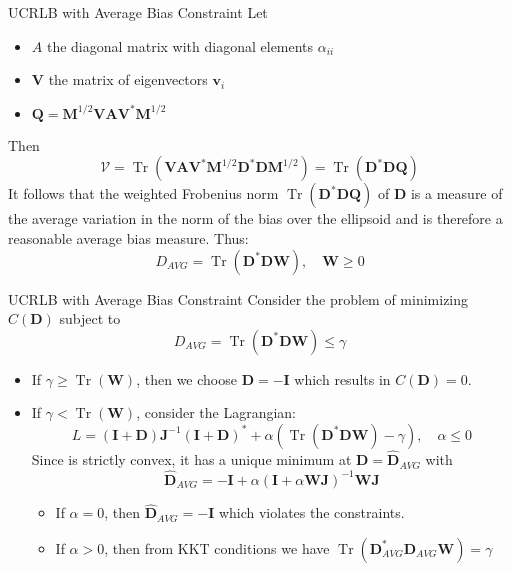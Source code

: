 \documentclass{beamer}
\begin{document}
\begin{frame}{UCRLB with Average Bias Constraint}
Let
\begin{itemize}
    \item $A$ the diagonal matrix with diagonal elements $\alpha_{ii}$
    \item $\mathbf{V}$ the matrix of eigenvectors $\mathbf{v}_i$
    \item $\mathbf{Q} = \mathbf{M}^{1/2} \mathbf{V A V}^* \mathbf{M}^{1/2}$
\end{itemize}
Then 
\[
 \mathcal{V} = \operatorname{Tr}\left(\mathbf{V A V}^*\mathbf{M}^{1/2}\mathbf{D}^*\mathbf{DM}^{1/2}\right)
  = \operatorname{Tr}(\mathbf{D}^*\mathbf{D Q})
\]
It follows that the weighted Frobenius norm $\operatorname{Tr}(\mathbf{D}^*\mathbf{D Q})$ of $\mathbf{D}$ 
is a measure of the average variation in the norm of the bias over the ellipsoid and is therefore a reasonable
average bias measure. Thus:
\[
D_{AVG} = \operatorname{Tr}(\mathbf{D}^*\mathbf{D W}), \quad \mathbf{W} \geq 0
\]
\end{frame}

\begin{frame}{UCRLB with Average Bias Constraint}
    Consider the problem of minimizing $C(\mathbf{D})$ subject to
    \[
    D_{AVG} = \operatorname{Tr}(\mathbf{D}^*\mathbf{D W}) \leq \gamma
    \]
    \begin{itemize}
        \item If $\gamma \geq \operatorname{Tr}(\mathbf{W})$, then we choose $\mathbf{D} = -\mathbf{I}$ which
        results in $C(\mathbf{D}) = 0$.
        \item If $\gamma < \operatorname{Tr}(\mathbf{W})$, consider the Lagrangian:
        \[
        L = (\mathbf{I} + \mathbf{D}) \mathbf{J}^{-1} (\mathbf{I} + \mathbf{D})^* +
        \alpha (\operatorname{Tr}(\mathbf{D}^*\mathbf{D W}) - \gamma), \quad \alpha \leq 0
        \]
        Since is strictly convex, it has a unique minimum at $\mathbf{D} = \hat{\mathbf{D}}_{AVG}$ with
        \[
        \hat{\mathbf{D}}_{AVG} = -\mathbf{I} + \alpha (\mathbf{I} + \alpha \mathbf{W J})^{-1}\mathbf{W J}
        \]
        \begin{itemize}
            \item If $\alpha = 0$, then $\hat{\mathbf{D}}_{AVG} = -\mathbf{I}$ which violates the constraints.
            \item If $\alpha > 0$, then from KKT conditions we have 
            $\operatorname{Tr}(\mathbf{D}_{AVG}^*\mathbf{D}_{AVG} \mathbf{W}) = \gamma$
        \end{itemize}
    \end{itemize}
\end{frame}
\end{document}
